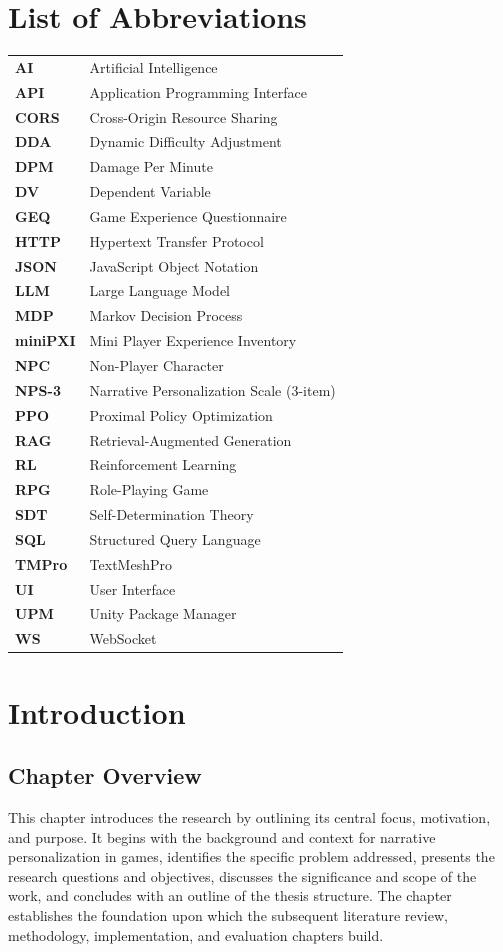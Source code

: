 \documentclass[12pt,a4paper]{report}
\newcommand{\abbrev}[2]{\textbf{#1} & #2 \\}
\begin{document}
\chapter*{List of Abbreviations}

\begin{longtable}{@{}p{3.5cm} p{10cm}@{}}
\abbrev{AI}{Artificial Intelligence}
\abbrev{API}{Application Programming Interface}
\abbrev{CORS}{Cross-Origin Resource Sharing}
\abbrev{DDA}{Dynamic Difficulty Adjustment}
\abbrev{DPM}{Damage Per Minute}
\abbrev{DV}{Dependent Variable}
\abbrev{GEQ}{Game Experience Questionnaire}
\abbrev{HTTP}{Hypertext Transfer Protocol}
\abbrev{JSON}{JavaScript Object Notation}
\abbrev{LLM}{Large Language Model}
\abbrev{MDP}{Markov Decision Process}
\abbrev{miniPXI}{Mini Player Experience Inventory}
\abbrev{NPC}{Non-Player Character}
\abbrev{NPS-3}{Narrative Personalization Scale (3-item)}
\abbrev{PPO}{Proximal Policy Optimization}
\abbrev{RAG}{Retrieval-Augmented Generation}
\abbrev{RL}{Reinforcement Learning}
\abbrev{RPG}{Role-Playing Game}
\abbrev{SDT}{Self-Determination Theory}
\abbrev{SQL}{Structured Query Language}
\abbrev{TMPro}{TextMeshPro}
\abbrev{UI}{User Interface}
\abbrev{UPM}{Unity Package Manager}
\abbrev{WS}{WebSocket}
\end{longtable}

\clearpage

\setcounter{page}{1}

\chapter{Introduction}

\section{Chapter Overview}

This chapter introduces the research by outlining its central focus, motivation, and purpose. It begins with the background and context for narrative personalization in games, identifies the specific problem addressed, presents the research questions and objectives, discusses the significance and scope of the work, and concludes with an outline of the thesis structure. The chapter establishes the foundation upon which the subsequent literature review, methodology, implementation, and evaluation chapters build.
\end{document}
